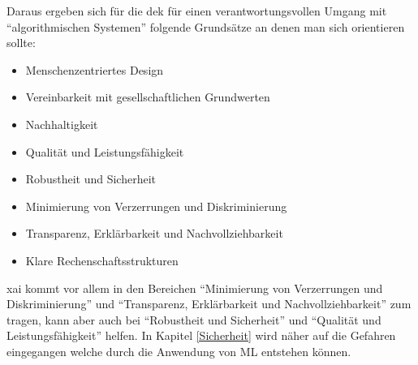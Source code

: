 \documentclass[
  12pt, %
  a4paper, %
  oneside, %
  openany, 
  numbers=noenddot, %
  BCOR=5mm, %
  parskip=half*, %
  thesis, %
]{bfhbook}
\begin{document}
Daraus ergeben sich für die \acrlong{dek} für einen verantwortungsvollen Umgang mit ``algorithmischen Systemen'' folgende Grundsätze an denen man sich orientieren sollte:

\begin{itemize}
	\item Menschenzentriertes Design
	\item Vereinbarkeit mit gesellschaftlichen Grundwerten
	\item Nachhaltigkeit
	\item Qualität und Leistungsfähigkeit
	\item Robustheit und Sicherheit
	\item Minimierung von Verzerrungen und Diskriminierung
	\item Transparenz, Erklärbarkeit und Nachvollziehbarkeit
	\item Klare Rechenschaftsstrukturen
\end{itemize}

\acrlong{xai} kommt vor allem in den Bereichen ``Minimierung von Verzerrungen und Diskriminierung'' und ``Transparenz, Erklärbarkeit und Nachvollziehbarkeit'' zum tragen, kann aber auch bei ``Robustheit und Sicherheit'' und ``Qualität und Leistungsfähigkeit'' helfen. In Kapitel \ref{Sicherheit} wird näher auf die Gefahren eingegangen welche durch die Anwendung von \Gls{ML} entstehen können.
\end{document}
